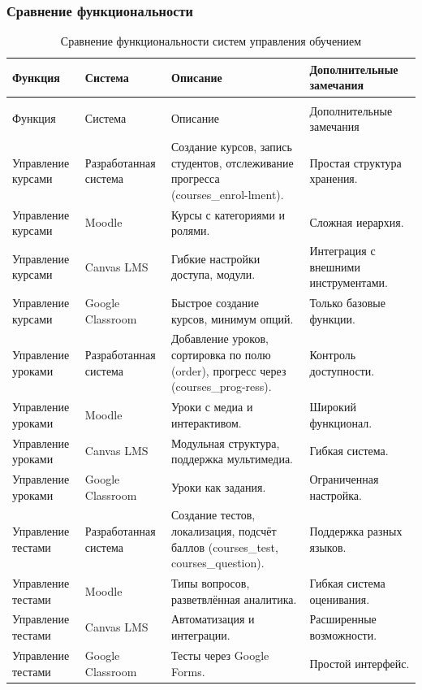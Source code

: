 \subsubsection{Сравнение функциональности}

\begin{xltabular}{\textwidth}{|p{3.1cm}|p{3.1cm}|p{3.5cm}|X|}
	\caption{Сравнение функциональности систем управления обучением\label{comparison:table}}\\ \hline
	Функция & Система & Описание & Дополнительные замечания \\ \hline
	\endfirsthead
	\\ \hline
	Функция & Система & Описание & Дополнительные замечания \\ \hline
	\endhead
	Управление курсами & Разработанная система & Создание курсов, запись студентов, отслеживание прогресса (courses\_enrol-lment). & Простая структура хранения. \\ \hline
	Управление курсами & Moodle & Курсы с категориями и ролями. & Сложная иерархия. \\ \hline
	Управление курсами & Canvas LMS & Гибкие настройки доступа, модули. & Интеграция с внешними инструментами. \\ \hline
	Управление курсами & Google Classroom & Быстрое создание курсов, минимум опций. & Только базовые функции. \\ \hline
	
	Управление уроками & Разработанная система & Добавление уроков, сортировка по полю (order), прогресс через (courses\_prog-ress). & Контроль доступности. \\ \hline
	Управление уроками & Moodle & Уроки с медиа и интерактивом. & Широкий функционал. \\ \hline
	Управление уроками & Canvas LMS & Модульная структура, поддержка мультимедиа. & Гибкая система. \\ \hline
	Управление уроками & Google Classroom & Уроки как задания. & Ограниченная настройка. \\ \hline
	
	Управление тестами & Разработанная система & Создание тестов, локализация, подсчёт баллов (courses\_test, courses\_question). & Поддержка разных языков. \\ \hline
	Управление тестами & Moodle & Типы вопросов, разветвлённая аналитика. & Гибкая система оценивания. \\ \hline
	Управление тестами & Canvas LMS & Автоматизация и интеграции. & Расширенные возможности. \\ \hline
	Управление тестами & Google Classroom & Тесты через Google Forms. & Простой интерфейс. \\ \hline
	

\end{xltabular}
